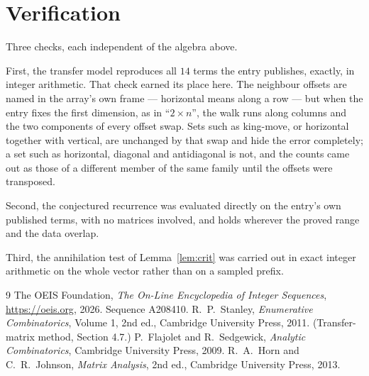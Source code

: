 \documentclass[11pt,a4paper]{article}
\theoremstyle{plain}
\theoremstyle{definition}
\begin{document}
\section{Verification}

Three checks, each independent of the algebra above.

First, the transfer model reproduces all $14$ terms the entry publishes, exactly, in
integer arithmetic. That check earned its place here. The neighbour offsets are named in the
array's own frame --- horizontal means along a row --- but when the entry fixes the first
dimension, as in ``$2\times n$'', the walk runs along columns and the two components of every
offset swap. Sets such as king-move, or horizontal together with vertical, are unchanged by
that swap and hide the error completely; a set such as horizontal, diagonal and antidiagonal
is not, and the counts came out as those of a different member of the same family until the
offsets were transposed.

Second, the conjectured recurrence was evaluated directly on the entry's own published terms,
with no matrices involved, and holds wherever the proved range and the data overlap.

Third, the annihilation test of Lemma~\ref{lem:crit} was carried out in exact integer
arithmetic on the whole vector rather than on a sampled prefix.

\begin{thebibliography}{9}
 The OEIS Foundation, \emph{The On-Line Encyclopedia of Integer
Sequences}, \url{https://oeis.org}, 2026. Sequence A208410.
 R.~P.~Stanley, \emph{Enumerative Combinatorics}, Volume 1, 2nd ed.,
Cambridge University Press, 2011. (Transfer-matrix method, Section 4.7.)
 P.~Flajolet and R.~Sedgewick, \emph{Analytic Combinatorics}, Cambridge
University Press, 2009.
 R.~A.~Horn and C.~R.~Johnson, \emph{Matrix Analysis}, 2nd ed., Cambridge
University Press, 2013.
\end{thebibliography}
\end{document}

